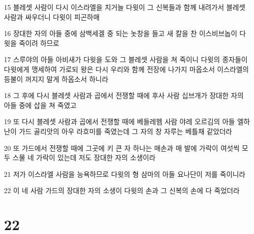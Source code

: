 \par 15 블레셋 사람이 다시 이스라엘을 치거늘 다윗이 그 신복들과 함께 내려가서 블레셋 사람과 싸우더니 다윗이 피곤하매
\par 16 장대한 자의 아들 중에 삼백세겔 중 되는 놋창을 들고 새 칼을 찬 이스비브놉이 다윗을 죽이려 하므로
\par 17 스루야의 아들 아비새가 다윗을 도와 그 블레셋 사람을 쳐 죽이니 다윗의 종자들이 다윗에게 맹세하여 가로되 왕은 다시 우리와 함께 전장에 나가지 마옵소서 이스라엘의 등불이 꺼지지 말게 하옵소서 하니라
\par 18 그 후에 다시 블레셋 사람과 곱에서 전쟁할 때에 후사 사람 십브개가 장대한 자의 아들 중에 삽을 쳐 죽였고
\par 19 또 다시 블레셋 사람과 곱에서 전쟁할 때에 베들레헴 사람 야레 오르김의 아들 엘하난이 가드 골리앗의 아우 라흐미를 죽였는데 그 자의 창 자루는 베틀채 같았더라
\par 20 또 가드에서 전쟁할 때에 그곳에 키 큰 자 하나는 매손과 매 발에 가락이 여섯씩 모두 스물 네 가락이 있는데 저도 장대한 자의 소생이라
\par 21 저가 이스라엘 사람을 능욕하므로 다윗의 형 삼마의 아들 요나단이 저를 죽이니라
\par 22 이 네 사람 가드의 장대한 자의 소생이 다윗의 손과 그 신복의 손에 다 죽었더라

\chapter{22}

